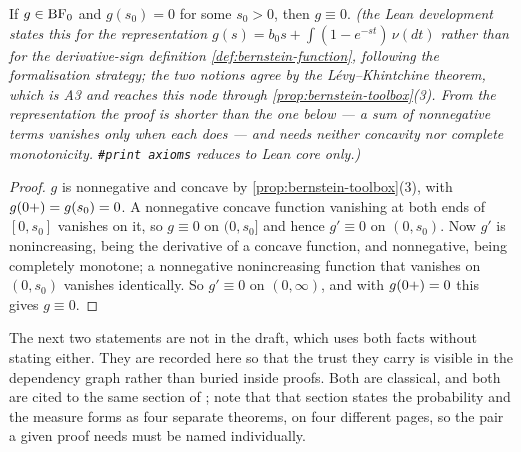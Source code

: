 \begin{lemma}\label{lem:vanishing}
\leanok
If $g \in \mathrm{BF}_0$ and $g(s_0) = 0$ for some $s_0 > 0$, then $g \equiv 0$.
\statusT\quad\emph{(the Lean development states this for the \emph{representation}
$g(s) = b_0 s + \int (1 - e^{-st})\,\nu(dt)$ rather than for the derivative-sign definition
\ref{def:bernstein-function}, following the formalisation strategy; the two notions agree by
the Lévy--Khintchine theorem, which is A3 and reaches this node through
\ref{prop:bernstein-toolbox}(3). From the representation the proof is shorter than the one
below --- a sum of nonnegative terms vanishes only when each does --- and needs neither
concavity nor complete monotonicity. \texttt{\#print axioms} reduces to Lean core only.)}
\end{lemma}

\begin{proof}
\leanok
$g$ is nonnegative and concave by \ref{prop:bernstein-toolbox}(3), with
$g(0{+}) = g(s_0) = 0$. A nonnegative concave function vanishing at both ends of $[0, s_0]$
vanishes on it, so $g \equiv 0$ on $(0, s_0]$ and hence $g' \equiv 0$ on $(0, s_0)$. Now $g'$
is nonincreasing, being the derivative of a concave function, and nonnegative, being
completely monotone; a nonnegative nonincreasing function that vanishes on $(0,s_0)$ vanishes
identically. So $g' \equiv 0$ on $(0,\infty)$, and with $g(0{+}) = 0$ this gives $g \equiv 0$.
\end{proof}

\bigskip

The next two statements are not in the draft, which uses both facts without stating either.
They are recorded here so that the trust they carry is visible in the dependency graph rather
than buried inside proofs. Both are classical, and both are cited to the same section of
; note that that section states the probability and the measure
forms as four separate theorems, on four different pages, so the pair a given proof needs must
be named individually.

